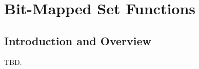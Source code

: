 \chapter{Bit-Mapped Set Functions}        
\label{cbsf0}

\section{Introduction and Overview}
\label{cbsf0:siov0}

TBD.



